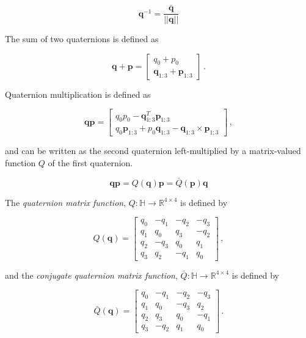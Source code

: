 \begin{equation}
	\mathbf{q}^{-1} = \frac{\bar{\mathbf{q}}}{||\mathbf{q}||}
\end{equation}

\noindent
The sum of two quaternions is defined as

\begin{equation}
  \mathbf{q} + \mathbf{p} = \begin{bmatrix}
  	q_0 + p_0 \\ \mathbf{q}_{1:3} + \mathbf{p}_{1:3}
  \end{bmatrix}\,.
\end{equation}

\noindent
Quaternion multiplication is defined as

\begin{equation}
  \mathbf{q} \mathbf{p} = \begin{bmatrix}
  	q_0 p_0 -\mathbf{q}^T_{1:3} \mathbf{p}_{1:3}\\
  	q_0 \mathbf{p}_{1:3} + p_0 \mathbf{q}_{1:3} - \mathbf{q}_{1:3} \times \mathbf{p}_{1:3}
  \end{bmatrix}\,,
\end{equation}

\noindent
and can be written as the second quaternion left-multiplied by a matrix-valued function $Q$ of the first quaternion.

\begin{equation}
  \mathbf{q} \mathbf{p} = Q(\mathbf{q}) \mathbf{p} = \bar{Q}(\mathbf{p}) \mathbf{q}
\end{equation}

\noindent
The \emph{quaternion matrix function}, $Q : \mathbb{H} \rightarrow \mathbb{R}^{4\times4}$ is defined by

\begin{equation}
	Q(\mathbf{q}) = \begin{bmatrix}
 q_0 & -q_1 & -q_2 & -q_3\\
 q_1 & q_0 & q_3 & -q_2\\
 q_2 & -q_3 & q_0 & q_1 \\
 q_3 & q_2 & -q_1 & q_0
\end{bmatrix}\,,
\end{equation}

\noindent
and the \emph{conjugate quaternion matrix function}, $\bar{Q} : \mathbb{H} \rightarrow \mathbb{R}^{4\times4}$ is defined by

\begin{equation}
	\bar{Q}(\mathbf{q}) = \begin{bmatrix}
 q_0 & -q_1 & -q_2 & -q_3\\
 q_1 & q_0 & -q_3 & q_2\\
 q_2 & q_3 & q_0 & -q_1 \\
 q_3 & -q_2 & q_1 & q_0
\end{bmatrix}\,.
\end{equation}



